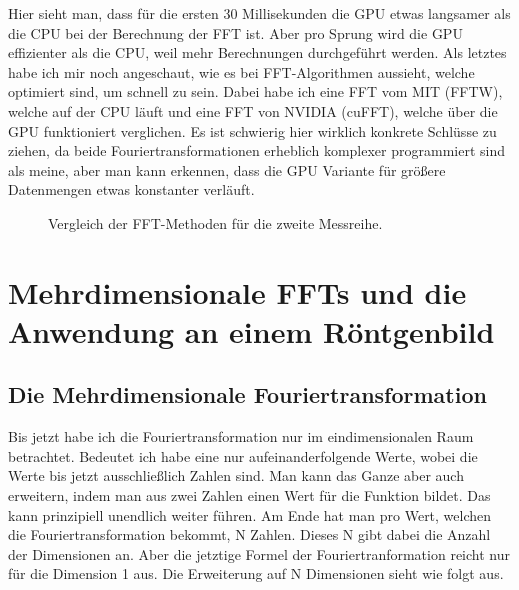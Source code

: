\documentclass[a4paper,12pt]{article}
\theoremstyle{definition}
\theoremstyle{remark}
\begin{document}
Hier sieht man, dass für die ersten 30 Millisekunden die GPU etwas langsamer als die CPU bei der Berechnung der FFT ist. 
Aber pro Sprung wird die GPU effizienter als die CPU, weil mehr Berechnungen durchgeführt werden. Als letztes habe ich mir 
noch angeschaut, wie es bei FFT-Algorithmen aussieht, welche optimiert sind, um schnell zu sein. Dabei habe ich eine FFT 
vom MIT (FFTW), welche auf der CPU läuft und eine FFT von NVIDIA (cuFFT), welche über die GPU funktioniert verglichen. Es ist schwierig 
hier wirklich konkrete Schlüsse zu ziehen, da beide Fouriertransformationen erheblich komplexer programmiert sind als meine,
aber man kann erkennen, dass die GPU Variante für größere Datenmengen etwas konstanter verläuft.

\begin{figure}[H]
  \centering
  \caption{Vergleich der FFT-Methoden für die zweite Messreihe.}
\end{figure}

\section{Mehrdimensionale FFTs und die Anwendung an einem Röntgenbild}
\subsection{Die Mehrdimensionale Fouriertransformation}
Bis jetzt habe ich die Fouriertransformation nur im eindimensionalen Raum betrachtet. Bedeutet ich habe eine nur aufeinanderfolgende Werte, 
wobei die Werte bis jetzt ausschließlich Zahlen sind. Man kann das Ganze aber auch erweitern, indem man aus zwei Zahlen einen Wert für die 
Funktion bildet. Das kann prinzipiell unendlich weiter führen. Am Ende hat man pro Wert, welchen die Fouriertransformation bekommt, N Zahlen.
Dieses N gibt dabei die Anzahl der Dimensionen an. Aber die jetztige Formel der Fouriertranformation reicht nur für die Dimension 1 aus. Die 
Erweiterung auf N Dimensionen sieht wie folgt aus. 
\end{document}
